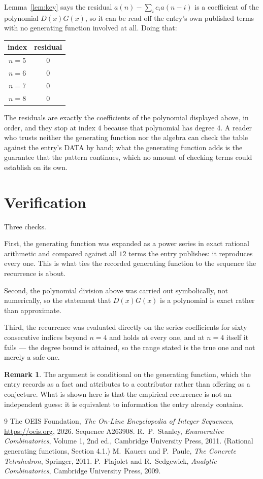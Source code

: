 \documentclass[11pt,a4paper]{article}
\theoremstyle{plain}
\theoremstyle{definition}
\newtheorem{remark}[theorem]{Remark}
\begin{document}
Lemma~\ref{lem:key} says the residual $a(n)-\sum_ic_ia(n-i)$ is a coefficient of the
polynomial $D(x)G(x)$, so it can be read off the entry's own published terms with no
generating function involved at all. Doing that:
\begin{center}
\begin{tabular}{cc}
index & residual \\ \hline
$n=5$ & $0$ \\
$n=6$ & $0$ \\
$n=7$ & $0$ \\
$n=8$ & $0$
\end{tabular}
\end{center}
The residuals are exactly the coefficients of the polynomial displayed above, in order, and
they stop at index $4$ because that polynomial has degree $4$. A reader who trusts
neither the generating function nor the algebra can check the table against the entry's DATA
by hand; what the generating function adds is the guarantee that the pattern continues, which
no amount of checking terms could establish on its own.

\section{Verification}

Three checks.

First, the generating function was expanded as a power series in exact rational arithmetic and
compared against all $12$ terms the entry publishes: it reproduces every one. This is
what ties the recorded generating function to the sequence the recurrence is about.

Second, the polynomial division above was carried out symbolically, not numerically, so the
statement that $D(x)G(x)$ is a polynomial is exact rather than approximate.

Third, the recurrence was evaluated directly on the series coefficients for sixty consecutive
indices beyond $n=4$ and holds at every one, and at $n=4$ itself it fails --- the
degree bound is attained, so the range stated is the true one and not merely a safe one.

\begin{remark}
The argument is conditional on the generating function, which the entry records as a fact and
attributes to a contributor rather than offering as a conjecture. What is shown here is that
the empirical recurrence is not an independent guess: it is equivalent to information the
entry already contains.
\end{remark}

\begin{thebibliography}{9}
 The OEIS Foundation, \emph{The On-Line Encyclopedia of Integer
Sequences}, \url{https://oeis.org}, 2026. Sequence A263908.
 R.~P.~Stanley, \emph{Enumerative Combinatorics}, Volume 1, 2nd ed.,
Cambridge University Press, 2011. (Rational generating functions, Section 4.1.)
 M.~Kauers and P.~Paule, \emph{The Concrete Tetrahedron}, Springer, 2011.
 P.~Flajolet and R.~Sedgewick, \emph{Analytic Combinatorics}, Cambridge
University Press, 2009.
\end{thebibliography}
\end{document}

